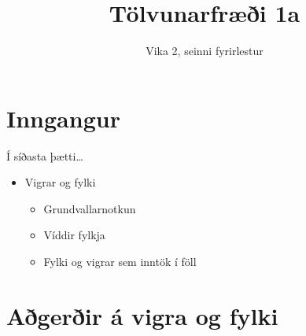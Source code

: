 \documentclass[handout]{beamer}
\title{Tölvunarfræði 1a}
\subtitle{Vika 2, seinni fyrirlestur}
\begin{document}
\begin{frame}
\titlepage
\end{frame}

\section{Inngangur}

\begin{frame}{Í síðasta þætti\ldots}
\begin{itemize}
 \item Vigrar og fylki
 \begin{itemize}
  \item Grundvallarnotkun
  \item Víddir fylkja
  \item Fylki og vigrar sem inntök í föll
 \end{itemize}
\end{itemize}
\end{frame}

\section{Aðgerðir á vigra og fylki}
\end{document}
